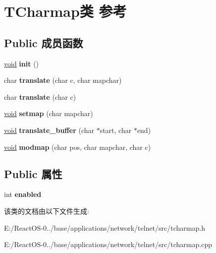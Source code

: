 \hypertarget{class_t_charmap}{}\section{T\+Charmap类 参考}
\label{class_t_charmap}
\subsection*{Public 成员函数}
\begin{DoxyCompactItemize}
\item 
\mbox{\label{class_t_charmap_a0ec5c38e1d4e5a5687936061b560234e}} 
\hyperlink{interfacevoid}{void} {\bfseries init} ()
\item 
\mbox{\label{class_t_charmap_a90a5a0bb8cd36a5f95a8f2a7c4455cb4}} 
char {\bfseries translate} (char c, char mapchar)
\item 
\mbox{\label{class_t_charmap_acc7c67b0537079b1902c32f310377d7f}} 
char {\bfseries translate} (char c)
\item 
\mbox{\label{class_t_charmap_a45dea99808bf2fcfc444d0f9ea906a0d}} 
\hyperlink{interfacevoid}{void} {\bfseries setmap} (char mapchar)
\item 
\mbox{\label{class_t_charmap_a873b8559b660c77f3c3e0169f19e885d}} 
\hyperlink{interfacevoid}{void} {\bfseries translate\+\_\+buffer} (char $\ast$start, char $\ast$end)
\item 
\mbox{\label{class_t_charmap_a0dcd4f38763a81103402edb25a296a66}} 
\hyperlink{interfacevoid}{void} {\bfseries modmap} (char pos, char mapchar, char c)
\end{DoxyCompactItemize}
\subsection*{Public 属性}
\begin{DoxyCompactItemize}
\item 
\mbox{\label{class_t_charmap_a08ac9f42ebe6f00b5a13b42b24e0ae1f}} 
int {\bfseries enabled}
\end{DoxyCompactItemize}


该类的文档由以下文件生成\+:\begin{DoxyCompactItemize}
\item 
E\+:/\+React\+O\+S-\/0../base/applications/network/telnet/src/tcharmap.\+h\item 
E\+:/\+React\+O\+S-\/0../base/applications/network/telnet/src/tcharmap.\+cpp\end{DoxyCompactItemize}
